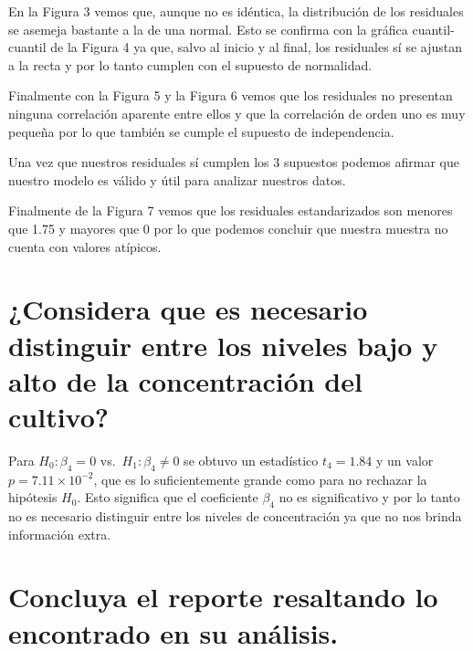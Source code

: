 \documentclass[10pt, spanish]{article}
\begin{document}
    En la Figura 3 vemos que, aunque no es idéntica, la distribución de los
residuales se asemeja bastante a la de una normal. Esto se confirma con
la gráfica cuantil-cuantil de la Figura 4 ya que, salvo al inicio y al
final, los residuales sí se ajustan a la recta y por lo tanto cumplen
con el supuesto de normalidad.

    \begin{center}
    \end{center}


    Finalmente con la Figura 5 y la Figura 6 vemos que los residuales no
presentan ninguna correlación aparente entre ellos y que la correlación
de orden uno es muy pequeña por lo que también se cumple el supuesto de
independencia.

Una vez que nuestros residuales sí cumplen los 3 supuestos podemos
afirmar que nuestro modelo es válido y útil para analizar nuestros
datos.

    \begin{center}
    \end{center}


    Finalmente de la Figura 7 vemos que los residuales estandarizados son
menores que 1.75 y mayores que 0 por lo que podemos concluir que nuestra
muestra no cuenta con valores atípicos.

    \hypertarget{considera-que-es-necesario-distinguir-entre-los-niveles-bajo-y-alto-de-la-concentraciuxf3n-del-cultivo}{%
\section{¿Considera que es necesario distinguir entre los niveles bajo y
alto de la concentración del
cultivo?}\label{considera-que-es-necesario-distinguir-entre-los-niveles-bajo-y-alto-de-la-concentraciuxf3n-del-cultivo}}

    Para \(H_0: \beta_4 = 0\)
vs.~\(H_1: \beta_4 \neq 0\) se obtuvo un estadístico \(t_4 = 1.84\) y un valor \(p = 7.11 \times 10^{-2}\), que es lo suficientemente grande como para no rechazar la hipótesis \(H_0\). Esto significa que el
coeficiente \(\beta_4\) no es significativo y por lo tanto no es
necesario distinguir entre los niveles de concentración ya que no nos
brinda información extra.

    \hypertarget{concluya-el-reporte-resaltando-lo-encontrado-en-su-anuxe1lisis.}{%
\section{Concluya el reporte resaltando lo encontrado en su
análisis.}\label{concluya-el-reporte-resaltando-lo-encontrado-en-su-anuxe1lisis.}}
\end{document}
